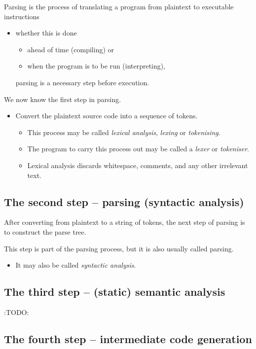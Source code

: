 \documentclass[11pt]{article}
\theoremstyle{definition}
\begin{document}
Parsing is the process of translating a program
from plaintext
to executable instructions
\begin{itemize}
\item whether this is done
\begin{itemize}
\item ahead of time (compiling) or
\item when the program is to be run (interpreting),
\end{itemize}
parsing is a necessary step before execution.
\end{itemize}

We now know the first step in parsing.
\begin{itemize}
\item Convert the plaintext source code into a sequence of tokens.
\begin{itemize}
\item This process may be
called \emph{lexical analysis}, \emph{lexing} or \emph{tokenising}.
\item The program to carry this process out may be
called a \emph{lexer} or \emph{tokeniser}.
\item Lexical analysis discards whitespace, comments, and any other
irrelevant text.
\end{itemize}
\end{itemize}

\subsection{The second step – parsing (syntactic analysis)}
\label{sec:org2990472}

After converting from plaintext to a string of tokens, the next
step of parsing is to construct the parse tree.

This step is part of the parsing process,
but it is also usually called parsing.
\begin{itemize}
\item It may also be called \emph{syntactic analysis}.
\end{itemize}

\subsection{The third step – (static) semantic analysis}
\label{sec:orgd799ac9}

:TODO:

\subsection{The fourth step – intermediate code generation}
\label{sec:org2db9e08}
\end{document}

